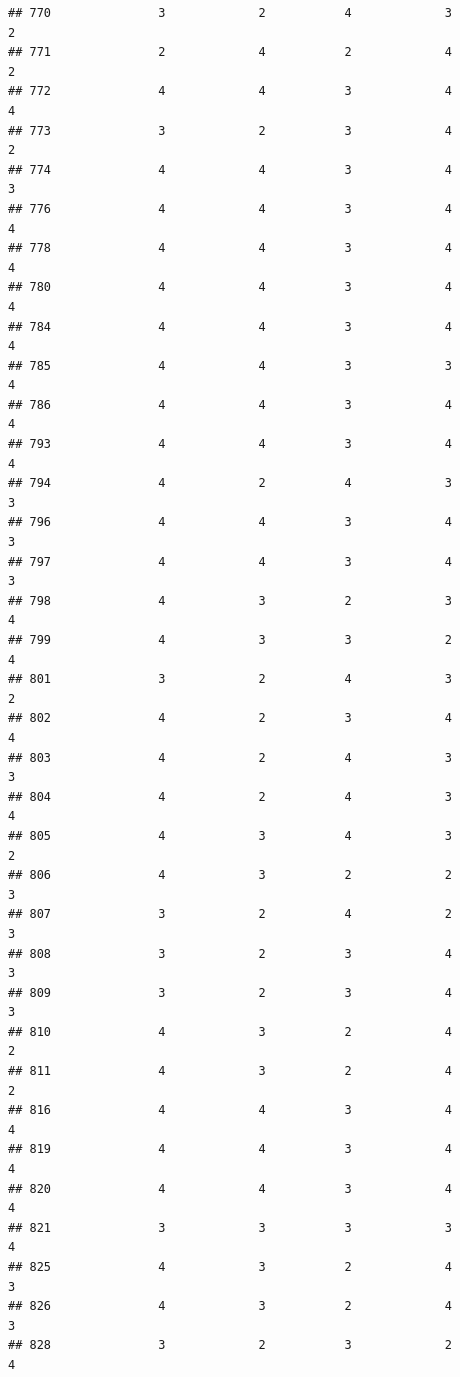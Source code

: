 \documentclass[
]{article}
\begin{document}
\begin{verbatim}
## 770               3             2           4             3            2
## 771               2             4           2             4            2
## 772               4             4           3             4            4
## 773               3             2           3             4            2
## 774               4             4           3             4            3
## 776               4             4           3             4            4
## 778               4             4           3             4            4
## 780               4             4           3             4            4
## 784               4             4           3             4            4
## 785               4             4           3             3            4
## 786               4             4           3             4            4
## 793               4             4           3             4            4
## 794               4             2           4             3            3
## 796               4             4           3             4            3
## 797               4             4           3             4            3
## 798               4             3           2             3            4
## 799               4             3           3             2            4
## 801               3             2           4             3            2
## 802               4             2           3             4            4
## 803               4             2           4             3            3
## 804               4             2           4             3            4
## 805               4             3           4             3            2
## 806               4             3           2             2            3
## 807               3             2           4             2            3
## 808               3             2           3             4            3
## 809               3             2           3             4            3
## 810               4             3           2             4            2
## 811               4             3           2             4            2
## 816               4             4           3             4            4
## 819               4             4           3             4            4
## 820               4             4           3             4            4
## 821               3             3           3             3            4
## 825               4             3           2             4            3
## 826               4             3           2             4            3
## 828               3             2           3             2            4

\end{verbatim}
\end{document}
